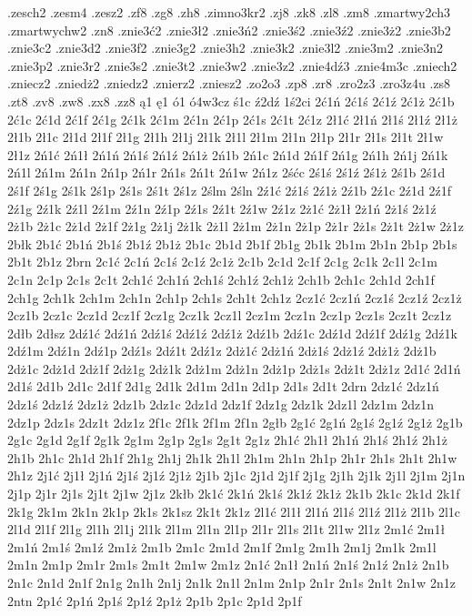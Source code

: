 {.zesch2
.zesm4
.zesz2
.zf8
.zg8
.zh8
.zimno3kr2
.zj8
.zk8
.zl8
.zm8
.zmartwy2ch3
.zmartwychw2
.zn8
.znie3ć2
.znie3ł2
.znie3ń2
.znie3ś2
.znie3ź2
.znie3ż2
.znie3b2
.znie3c2
.znie3d2
.znie3f2
.znie3g2
.znie3h2
.znie3k2
.znie3l2
.znie3m2
.znie3n2
.znie3p2
.znie3r2
.znie3s2
.znie3t2
.znie3w2
.znie3z2
.znie4dź3
.znie4m3c
.zniech2
.zniecz2
.zniedż2
.zniedz2
.znierz2
.zniesz2
.zo2o3
.zp8
.zr8
.zro2z3
.zro3z4u
.zs8
.zt8
.zv8
.zw8
.zx8
.zz8
ą1
ę1
ó1
ó4w3cz
ś1c
ź2dź
1ś2ci
2ć1ń
2ć1ś
2ć1ź
2ć1ż
2ć1b
2ć1c
2ć1d
2ć1f
2ć1g
2ć1k
2ć1m
2ć1n
2ć1p
2ć1s
2ć1t
2ć1z
2ł1ć
2ł1ń
2ł1ś
2ł1ź
2ł1ż
2ł1b
2ł1c
2ł1d
2ł1f
2ł1g
2ł1h
2ł1j
2ł1k
2ł1l
2ł1m
2ł1n
2ł1p
2ł1r
2ł1s
2ł1t
2ł1w
2ł1z
2ń1ć
2ń1ł
2ń1ń
2ń1ś
2ń1ź
2ń1ż
2ń1b
2ń1c
2ń1d
2ń1f
2ń1g
2ń1h
2ń1j
2ń1k
2ń1l
2ń1m
2ń1n
2ń1p
2ń1r
2ń1s
2ń1t
2ń1w
2ń1z
2śćc
2ś1ś
2ś1ź
2ś1ż
2ś1b
2ś1d
2ś1f
2ś1g
2ś1k
2ś1p
2ś1s
2ś1t
2ś1z
2ślm
2śln
2ź1ć
2ź1ś
2ź1ż
2ź1b
2ź1c
2ź1d
2ź1f
2ź1g
2ź1k
2ź1l
2ź1m
2ź1n
2ź1p
2ź1s
2ź1t
2ź1w
2ź1z
2ż1ć
2ż1ł
2ż1ń
2ż1ś
2ż1ź
2ż1b
2ż1c
2ż1d
2ż1f
2ż1g
2ż1j
2ż1k
2ż1l
2ż1m
2ż1n
2ż1p
2ż1r
2ż1s
2ż1t
2ż1w
2ż1z
2błk
2b1ć
2b1ń
2b1ś
2b1ź
2b1ż
2b1c
2b1d
2b1f
2b1g
2b1k
2b1m
2b1n
2b1p
2b1s
2b1t
2b1z
2brn
2c1ć
2c1ń
2c1ś
2c1ź
2c1ż
2c1b
2c1d
2c1f
2c1g
2c1k
2c1l
2c1m
2c1n
2c1p
2c1s
2c1t
2ch1ć
2ch1ń
2ch1ś
2ch1ź
2ch1ż
2ch1b
2ch1c
2ch1d
2ch1f
2ch1g
2ch1k
2ch1m
2ch1n
2ch1p
2ch1s
2ch1t
2ch1z
2cz1ć
2cz1ń
2cz1ś
2cz1ź
2cz1ż
2cz1b
2cz1c
2cz1d
2cz1f
2cz1g
2cz1k
2cz1l
2cz1m
2cz1n
2cz1p
2cz1s
2cz1t
2cz1z
2dłb
2dłsz
2dź1ć
2dź1ń
2dź1ś
2dź1ź
2dź1ż
2dź1b
2dź1c
2dź1d
2dź1f
2dź1g
2dź1k
2dź1m
2dź1n
2dź1p
2dź1s
2dź1t
2dź1z
2dż1ć
2dż1ń
2dż1ś
2dż1ź
2dż1ż
2dż1b
2dż1c
2dż1d
2dż1f
2dż1g
2dż1k
2dż1m
2dż1n
2dż1p
2dż1s
2dż1t
2dż1z
2d1ć
2d1ń
2d1ś
2d1b
2d1c
2d1f
2d1g
2d1k
2d1m
2d1n
2d1p
2d1s
2d1t
2drn
2dz1ć
2dz1ń
2dz1ś
2dz1ź
2dz1ż
2dz1b
2dz1c
2dz1d
2dz1f
2dz1g
2dz1k
2dz1l
2dz1m
2dz1n
2dz1p
2dz1s
2dz1t
2dz1z
2f1c
2f1k
2f1m
2f1n
2głb
2g1ć
2g1ń
2g1ś
2g1ź
2g1ż
2g1b
2g1c
2g1d
2g1f
2g1k
2g1m
2g1p
2g1s
2g1t
2g1z
2h1ć
2h1ł
2h1ń
2h1ś
2h1ź
2h1ż
2h1b
2h1c
2h1d
2h1f
2h1g
2h1j
2h1k
2h1l
2h1m
2h1n
2h1p
2h1r
2h1s
2h1t
2h1w
2h1z
2j1ć
2j1ł
2j1ń
2j1ś
2j1ź
2j1ż
2j1b
2j1c
2j1d
2j1f
2j1g
2j1h
2j1k
2j1l
2j1m
2j1n
2j1p
2j1r
2j1s
2j1t
2j1w
2j1z
2kłb
2k1ć
2k1ń
2k1ś
2k1ź
2k1ż
2k1b
2k1c
2k1d
2k1f
2k1g
2k1m
2k1n
2k1p
2k1s
2k1sz
2k1t
2k1z
2l1ć
2l1ł
2l1ń
2l1ś
2l1ź
2l1ż
2l1b
2l1c
2l1d
2l1f
2l1g
2l1h
2l1j
2l1k
2l1m
2l1n
2l1p
2l1r
2l1s
2l1t
2l1w
2l1z
2m1ć
2m1ł
2m1ń
2m1ś
2m1ź
2m1ż
2m1b
2m1c
2m1d
2m1f
2m1g
2m1h
2m1j
2m1k
2m1l
2m1n
2m1p
2m1r
2m1s
2m1t
2m1w
2m1z
2n1ć
2n1ł
2n1ń
2n1ś
2n1ź
2n1ż
2n1b
2n1c
2n1d
2n1f
2n1g
2n1h
2n1j
2n1k
2n1l
2n1m
2n1p
2n1r
2n1s
2n1t
2n1w
2n1z
2ntn
2p1ć
2p1ń
2p1ś
2p1ź
2p1ż
2p1b
2p1c
2p1d
2p1f
}
